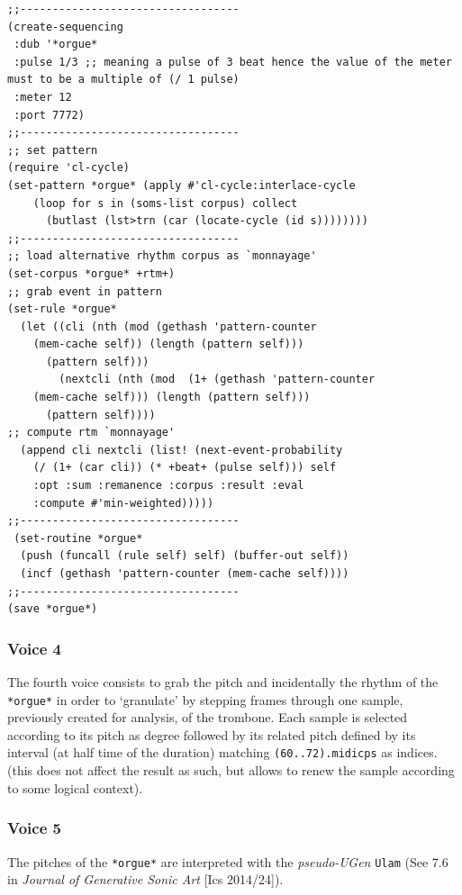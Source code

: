 \documentclass{article}
\begin{document}
\begin{lstlisting}[language=N3]
;;----------------------------------
(create-sequencing
 :dub '*orgue*
 :pulse 1/3 ;; meaning a pulse of 3 beat hence the value of the meter must to be a multiple of (/ 1 pulse)
 :meter 12 
 :port 7772)
;;----------------------------------
;; set pattern
(require 'cl-cycle)
(set-pattern *orgue* (apply #'cl-cycle:interlace-cycle
    (loop for s in (soms-list corpus) collect
      (butlast (lst>trn (car (locate-cycle (id s))))))))	
;;----------------------------------		
;; load alternative rhythm corpus as `monnayage'
(set-corpus *orgue* +rtm+)
;; grab event in pattern 
(set-rule *orgue* 
  (let ((cli (nth (mod (gethash 'pattern-counter 
    (mem-cache self)) (length (pattern self))) 
      (pattern self)))
        (nextcli (nth (mod  (1+ (gethash 'pattern-counter 
    (mem-cache self))) (length (pattern self))) 
      (pattern self))))
;; compute rtm `monnayage'
  (append cli nextcli (list! (next-event-probability 
    (/ (1+ (car cli)) (* +beat+ (pulse self))) self 
    :opt :sum :remanence :corpus :result :eval 
    :compute #'min-weighted)))))
;;----------------------------------
 (set-routine *orgue* 
  (push (funcall (rule self) self) (buffer-out self))
  (incf (gethash 'pattern-counter (mem-cache self))))
;;----------------------------------
(save *orgue*)
\end{lstlisting}

\subsubsection{Voice 4}

The fourth voice consists to grab the pitch and incidentally the rhythm of the \texttt{*orgue*} in order to `granulate' by stepping frames through one sample, previously created for analysis, of the trombone. Each sample is selected according to its pitch as degree followed by its related pitch defined by its interval (at half time of the duration) matching \texttt{(60..72).midicps} as indices. (this does not affect the result as such, but allows to renew the sample according to some logical context). 

\subsubsection{Voice 5}

The pitches of the \texttt{*orgue*} are interpreted with the \textit{pseudo-UGen} \texttt{Ulam} 
(See 7.6 in \textsl{Journal of Generative Sonic Art} [Ics 2014/24]).%
\end{document}
